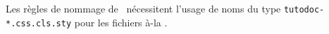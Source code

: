 \documentclass[12pt, a4paper, theme = color]{tutodoc}
\begin{document}
\begin{tdoctech}
    \item Les règles de nommage de \ctan\ nécessitent l'usage de noms du type \verb+tutodoc-*.css.cls.sty+ pour les fichiers à-la .
\end{tdoctech}
\end{document}
